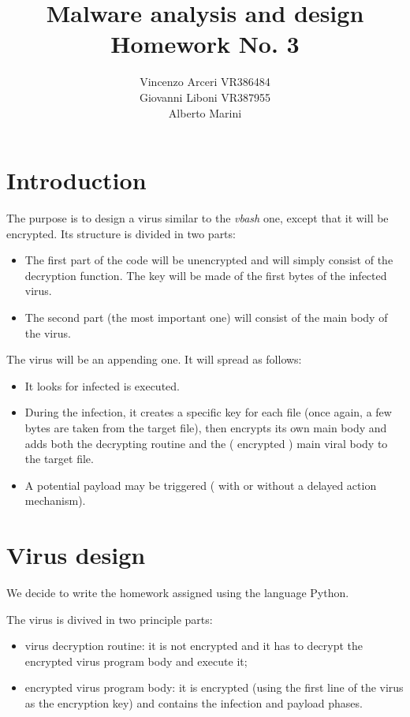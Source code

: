 \documentclass[a4paper,11pt]{article}
\begin{document}
\author{Vincenzo Arceri VR386484 \\ Giovanni Liboni VR387955 \\ Alberto Marini}
\title{Malware analysis and design \\ Homework No. 3}
\maketitle

\section{Introduction}
The purpose is to design a virus similar to the \textit{vbash} one, except that it will be encrypted. Its structure is divided in two parts:
\begin{itemize}
\item The first part of the code will be unencrypted and will simply consist of the decryption function. The key will be made of the first bytes of the infected virus.
\item The second part (the most important one) will consist of the main body of the virus.
\end{itemize}
The virus will be an appending one. It will spread as follows:
\begin{itemize}
\item It looks for infected is executed.
\item During the infection, it creates a specific key for each file (once again, a few bytes are taken from the target file), then encrypts its own main body and adds both the decrypting routine and the ( encrypted ) main viral body to the target file.
\item A potential payload may be triggered ( with or without a delayed action mechanism).
\end{itemize}

\section{Virus design}
We decide to write the homework assigned using the language Python.

The virus is divived in two principle parts:
\begin{itemize}
\item virus decryption routine: it is not encrypted and it has to decrypt the encrypted virus program body and execute it;
\item encrypted virus program body: it is encrypted (using the first line of the virus as the encryption key) and contains the infection and payload phases.
\end{itemize}
\end{document}

